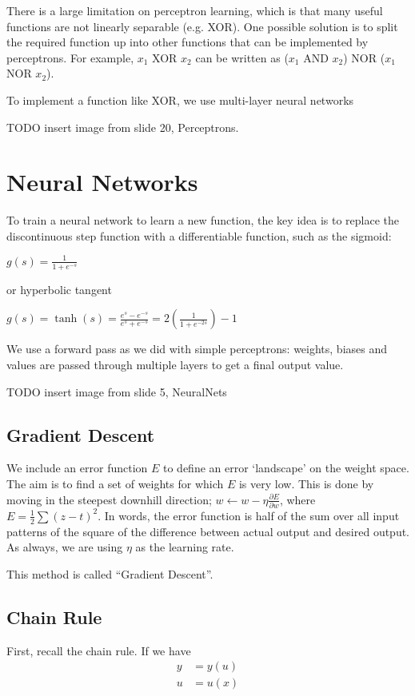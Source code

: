 There is a large limitation on perceptron learning, which is that many useful
functions are not linearly separable (e.g. XOR). One possible solution is to
split the required function up into other functions that can be implemented by
perceptrons. For example, $x_1$ XOR $x_2$ can be written as ($x_1$ AND $x_2$)
NOR ($x_1$ NOR $x_2$).

To implement a function like XOR, we use multi-layer neural networks

TODO insert image from slide 20, Perceptrons.

\chapter{Neural Networks}
To train a neural network to learn a new function, the key idea is to replace
the discontinuous step function with a differentiable function, such as the
sigmoid:
{\centering
    $g(s) = \frac{1}{1 + e^{-s}}$

}

or hyperbolic tangent
{\centering
    $g(s) = \tanh(s) = \frac{e^s - e^{-s}}{e^s + e^{-s}} = 2(\frac{1}{1 + e^{-2s}}) - 1$

}

We use a forward pass as we did with simple perceptrons: weights, biases and
values are passed through multiple layers to get a final output value.

TODO insert image from slide 5, NeuralNets

\section{Gradient Descent}
We include an error function $E$ to define an error `landscape' on the weight
space. The aim is to find a set of weights for which $E$ is very low. This is
done by moving in the steepest downhill direction; $w \leftarrow w - \eta
\frac{\partial E}{\partial w}$, where $E = \frac{1}{2} \sum (z - t)^2$. In
words, the error function is half of the sum over all input patterns of the
square of the difference between actual output and desired output. As always,
we are using $\eta$ as the learning rate.

This method is called ``Gradient Descent''.

\section{Chain Rule}
First, recall the chain rule. If we have
\begin{align*}
    y &= y(u)\\
    u &= u(x)
\end{align*}

